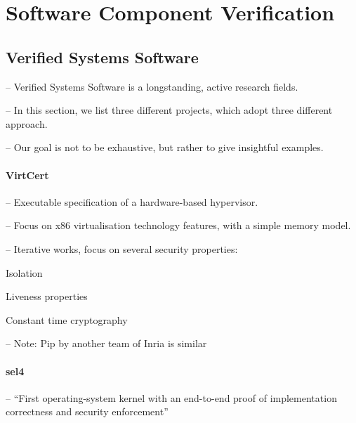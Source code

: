 \section{Software Component Verification} %
\label{sec:relatedwork:software}

\subsection{Verified Systems Software} %

\begin{compactitem}
\item[--] Verified Systems Software is a longstanding, active research fields.
\item[--] In this section, we list three different projects, which adopt three
  different approach.
\item[--] Our goal is not to be exhaustive, but rather to give insightful
  examples.
\end{compactitem}

\paragraph{VirtCert}
%
\begin{compactitem}
\item[--] Executable specification of a hardware-based hypervisor.
%
\item[--] Focus on x86 virtualisation technology features, with a simple memory
  model.
\item[--] Iterative works, focus on several security properties:
  \begin{compactitem}
  \item Isolation
  \item Liveness properties
  \item Constant time cryptography
  \end{compactitem}
\item[--] Note: Pip by another team of Inria is similar
\end{compactitem}

\paragraph{sel4}
%
\begin{compactitem}
\item[--] ``First operating-system kernel with an end-to-end proof of
  implementation correctness and security enforcement''
\end{compactitem}

